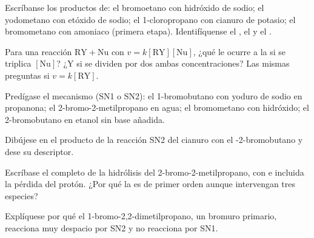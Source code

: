 \begin{exercise}[$\star$]\label{exo:b1:nucleophilic-substitution:1}
Escríbanse los productos de: el bromoetano con hidróxido de sodio; el
yodometano con etóxido de sodio; el 1-cloropropano con cianuro de
potasio; el bromometano con amoniaco (primera etapa). Identifíquense el
, el  y el .
\end{exercise}

\begin{exercise}[$\star$]\label{exo:b1:nucleophilic-substitution:2}
Para una reacción $\mathrm{RY} + \mathrm{Nu}$ con
$v = k[\mathrm{RY}][\mathrm{Nu}]$, ¿qué le ocurre a la 
si se triplica $[\mathrm{Nu}]$? ¿Y si se dividen por dos ambas
concentraciones? Las mismas preguntas si $v = k[\mathrm{RY}]$.
\end{exercise}

\begin{exercise}[$\star$]\label{exo:b1:nucleophilic-substitution:3}
Predígase el mecanismo (SN1 o SN2): el 1-bromobutano con yoduro de sodio
en propanona; el 2-bromo-2-metilpropano en agua; el bromometano con
hidróxido; el 2-bromobutano en etanol sin base añadida.
\end{exercise}

\begin{exercise}[$\star$]\label{exo:b1:nucleophilic-substitution:4}
Dibújese en  el producto de la reacción SN2 del
cianuro con el -2-bromobutano y dese su descriptor.
\end{exercise}

\begin{exercise}[$\star\star$]\label{exo:b1:nucleophilic-substitution:5}
Escríbase el  completo de la hidrólisis del
2-bromo-2-metilpropano, con  e incluida la pérdida del
protón. ¿Por qué la  es de primer orden aunque
intervengan tres especies?
\end{exercise}

\begin{exercise}[$\star\star$]\label{exo:b1:nucleophilic-substitution:6}
Explíquese por qué el 1-bromo-2,2-dimetilpropano, un bromuro primario,
reacciona muy despacio por SN2 y no reacciona por SN1.
\end{exercise}

